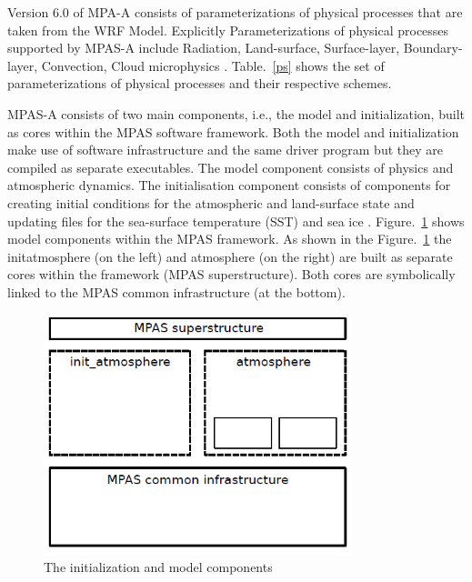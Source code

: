 \documentclass[9pt,a4paper]{article}
\begin{document}
		Version 6.0 of MPA-A consists of parameterizations of physical processes that are taken from the WRF Model.  Explicitly Parameterizations of physical processes supported by MPAS-A include Radiation, Land-surface, Surface-layer, Boundary-layer, Convection, Cloud microphysics \citep{n.d.}. Table.~\ref{ps} shows the set of parameterizations of physical processes and their respective schemes. 
		

		
		
		MPAS-A consists of two  main components, i.e., the model and initialization, built as cores within the MPAS software framework. Both the model and initialization make use of software infrastructure and the same driver program but they are compiled as separate executables. The model component consists of physics and atmospheric dynamics. The initialisation component consists of components for creating initial conditions for the atmospheric and land-surface state and updating files for the sea-surface temperature (SST) and sea ice \citep{n.d.}. Figure.~\ref{components} shows model components within the MPAS framework. As shown in the Figure.~\ref{components} the init\textunderscore atmosphere (on the left) and atmosphere (on the right) are built as separate cores within the framework (MPAS superstructure). Both cores are symbolically linked to the MPAS common infrastructure (at the bottom).
		
		\begin{figure}[H]
			\centering 
			\includegraphics[width=0.8\textwidth]{images/componenets.png}
			\caption{The initialization and model components \citep{n.d.}}
			\label{components} 
		\end{figure}
		
\end{document}
